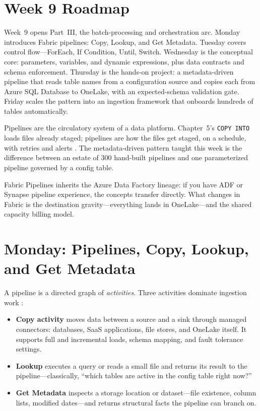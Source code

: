 \section{Week 9 Roadmap}
Week~9 opens Part~III, the batch-processing and orchestration arc. Monday introduces Fabric pipelines: Copy, Lookup, and Get Metadata. Tuesday covers control flow---ForEach, If Condition, Until, Switch. Wednesday is the conceptual core: parameters, variables, and dynamic expressions, plus data contracts and schema enforcement. Thursday is the hands-on project: a metadata-driven pipeline that reads table names from a configuration source and copies each from Azure SQL Database to OneLake, with an expected-schema validation gate. Friday scales the pattern into an ingestion framework that onboards hundreds of tables automatically.

Pipelines are the circulatory system of a data platform. Chapter~5's \texttt{COPY INTO} loads files already staged; pipelines are how the files get staged, on a schedule, with retries and alerts \cite{microsoftFabricPipelines}. The metadata-driven pattern taught this week is the difference between an estate of 300 hand-built pipelines and one parameterized pipeline governed by a config table.

\begin{notebox}
Fabric Pipelines inherits the Azure Data Factory lineage: if you have ADF or Synapse pipeline experience, the concepts transfer directly. What changes in Fabric is the destination gravity---everything lands in OneLake---and the shared capacity billing model.
\end{notebox}

\section{Monday: Pipelines, Copy, Lookup, and Get Metadata}
A pipeline is a directed graph of \emph{activities}. Three activities dominate ingestion work \cite{microsoftFabricPipelines,microsoftFabricDataFactory}:

\begin{itemize}
    \item \textbf{Copy activity} moves data between a source and a sink through managed connectors: databases, SaaS applications, file stores, and OneLake itself. It supports full and incremental loads, schema mapping, and fault tolerance settings.
    \item \textbf{Lookup} executes a query or reads a small file and returns its result to the pipeline---classically, ``which tables are active in the config table right now?''
    \item \textbf{Get Metadata} inspects a storage location or dataset---file existence, column lists, modified dates---and returns structural facts the pipeline can branch on.
\end{itemize}

